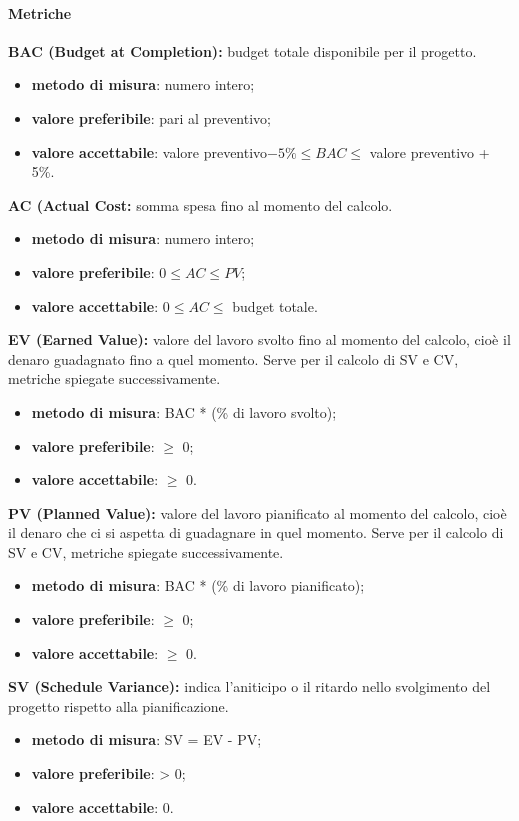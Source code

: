 \paragraph{Metriche}
\textbf{BAC (Budget at Completion):} budget totale disponibile per il progetto.
\begin{itemize}
    \item \textbf{metodo di misura}: numero intero;
    \item \textbf{valore preferibile}: pari al preventivo;
    \item \textbf{valore accettabile}: valore preventivo$ - 5\% \leq BAC \leq$ valore preventivo + 5\%.
\end{itemize}
\textbf{AC (Actual Cost:} somma spesa fino al momento del calcolo.
\begin{itemize}
    \item \textbf{metodo di misura}: numero intero;
    \item \textbf{valore preferibile}: $0 \leq AC \leq PV$;
    \item \textbf{valore accettabile}: $0 \leq AC \leq$ budget totale.
\end{itemize}
\textbf{EV (Earned Value):} valore del lavoro svolto fino al momento del calcolo, cioè il denaro guadagnato fino a quel momento.
Serve per il calcolo di SV e CV, metriche spiegate successivamente.
\begin{itemize}
    \item \textbf{metodo di misura}: BAC * (\% di lavoro svolto);
    \item \textbf{valore preferibile}: $\geq$ 0;
    \item \textbf{valore accettabile}: $\geq$ 0.
\end{itemize}
\textbf{PV (Planned Value):} valore del lavoro pianificato al momento del calcolo, cioè il denaro che ci si aspetta di guadagnare in quel momento.
Serve per il calcolo di SV e CV, metriche spiegate successivamente.
\begin{itemize}
    \item \textbf{metodo di misura}: BAC * (\% di lavoro pianificato);
    \item \textbf{valore preferibile}: $\geq$ 0;
    \item \textbf{valore accettabile}: $\geq$ 0.
\end{itemize}
\textbf{SV (Schedule Variance):} indica l'aniticipo o il ritardo nello svolgimento del progetto rispetto alla pianificazione.
\begin{itemize}
    \item \textbf{metodo di misura}: SV = EV - PV;
    \item \textbf{valore preferibile}: > 0;
    \item \textbf{valore accettabile}: 0.
\end{itemize}
